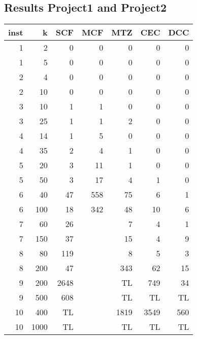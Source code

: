\documentclass[11pt]{article}
\begin{document}
\subsection{Results Project1 and Project2}
\begin{tabular}{rrrrrrr}
\toprule
  inst &     k &  SCF & MCF & MTZ & CEC & DCC \\
\midrule
     1 &     2 &            0 &             0 &             0 &             0 &             0 \\
     1 &     5 &            0 &             0 &             0 &             0 &             0 \\
     2 &     4 &            0 &             0 &             0 &             0 &             0 \\
     2 &    10 &            0 &             0 &             0 &             0 &             0 \\
     3 &    10 &            1 &             1 &             0 &             0 &             0 \\
     3 &    25 &            1 &             1 &             2 &             0 &             0 \\
     4 &    14 &            1 &             5 &             0 &             0 &             0 \\
     4 &    35 &            2 &             4 &             1 &             0 &             0 \\
     5 &    20 &            3 &            11 &             1 &             0 &             0 \\
     5 &    50 &            3 &            17 &             4 &             1 &             0 \\
     6 &    40 &           47 &           558 &            75 &             6 &             1 \\
     6 &   100 &           18 &           342 &            48 &            10 &             6 \\
     7 &    60 &           26 &               &              7 &             4 &             1\\ 
     7 &   150 &           37 &               &             15 &             4 &             9\\ 
     8 &    80 &          119 &               &              8 &             5 &             3\\ 
     8 &   200 &           47 &               &            343 &            62 &            15\\ 
     9 &   200 &         2648 &               &           TL &             749 &            34\\ 
     9 &   500 &          608 &               &           TL &            TL &              TL\\   
    10 &   400 &           TL &               &           1819 &          3549 &           560\\ 
    10 &  1000 &           TL &               &           TL &            TL &              TL\\   
\bottomrule
\end{tabular}
\end{document}
